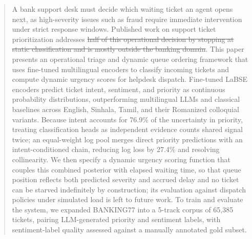 \begin{abstract}
A bank support desk must decide which waiting ticket an agent opens next, as high-severity issues such as fraud require immediate intervention under strict response windows. Published work on support ticket prioritization addresses \sout{half of this operational decision by stopping at static classification and is mostly outside the banking domain}. This paper presents an operational triage and dynamic queue ordering framework that uses fine-tuned multilingual encoders to classify incoming tickets and compute dynamic urgency scores for helpdesk dispatch. Fine-tuned LaBSE encoders predict ticket intent, sentiment, and priority as continuous probability distributions, outperforming multilingual LLMs and classical baselines across English, Sinhala, Tamil, and their Romanized colloquial variants. Because intent accounts for 76.9\% of the uncertainty in priority, treating classification heads as independent evidence counts shared signal twice; an equal-weight log pool merges direct priority predictions with an intent-conditioned chain, reducing log loss by 27.4\% and resolving collinearity. We then specify a dynamic urgency scoring function that couples this combined posterior with elapsed waiting time, so that queue position reflects both predicted severity and accrued delay and no ticket can be starved indefinitely by construction; its evaluation against dispatch policies under simulated load is left to future work. To train and evaluate the system, we expanded BANKING77 into a 5-track corpus of 65,385 tickets, pairing LLM-generated priority and sentiment labels, with sentiment-label quality assessed against a manually annotated gold subset.
\end{abstract}

